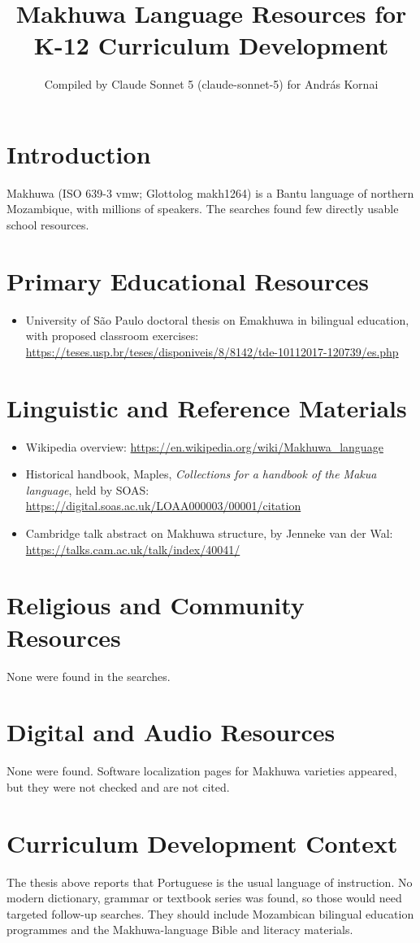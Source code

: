 \documentclass[12pt]{article}
\title{Makhuwa Language Resources for K-12 Curriculum Development}
\author{Compiled by Claude Sonnet 5 (claude-sonnet-5) for Andr\'as Kornai}
\date{}
\begin{document}
\maketitle

\section{Introduction}
Makhuwa (ISO 639-3 vmw; Glottolog makh1264) is a Bantu language of northern Mozambique, with millions of speakers. The searches found few directly usable school resources.

\section{Primary Educational Resources}
\begin{itemize}
\item University of S\~ao Paulo doctoral thesis on Emakhuwa in bilingual education, with proposed classroom exercises: \url{https://teses.usp.br/teses/disponiveis/8/8142/tde-10112017-120739/es.php}
\end{itemize}

\section{Linguistic and Reference Materials}
\begin{itemize}
\item Wikipedia overview: \url{https://en.wikipedia.org/wiki/Makhuwa_language}
\item Historical handbook, Maples, \emph{Collections for a handbook of the Makua language}, held by SOAS: \url{https://digital.soas.ac.uk/LOAA000003/00001/citation}
\item Cambridge talk abstract on Makhuwa structure, by Jenneke van der Wal: \url{https://talks.cam.ac.uk/talk/index/40041/}
\end{itemize}

\section{Religious and Community Resources}
None were found in the searches.

\section{Digital and Audio Resources}
None were found. Software localization pages for Makhuwa varieties appeared, but they were not checked and are not cited.

\section{Curriculum Development Context}
The thesis above reports that Portuguese is the usual language of instruction. No modern dictionary, grammar or textbook series was found, so those would need targeted follow-up searches. They should include Mozambican bilingual education programmes and the Makhuwa-language Bible and literacy materials.
\end{document}
